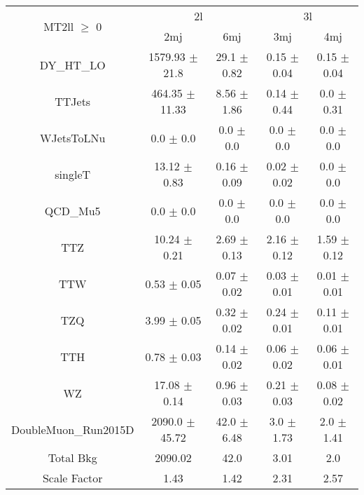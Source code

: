 \documentclass[8pt,landscape]{article}
\begin{document}
\begin{tabular}{|c||c|c||c|c|}
\hline
\multirow{2}{*}{MT2ll $\geq$ 0}& \multicolumn{2}{|c||}{2l}& \multicolumn{2}{|c|}{3l}\\ \cline{2-3} 
& 2mj& 6mj& 3mj& 4mj\\ \hline \hline 
DY\_HT\_LO & 1579.93 $\pm$ 21.8 & 29.1 $\pm$ 0.82 & 0.15 $\pm$ 0.04 & 0.15 $\pm$ 0.04\\ \hline 
TTJets & 464.35 $\pm$ 11.33 & 8.56 $\pm$ 1.86 & 0.14 $\pm$ 0.44 & 0.0 $\pm$ 0.31\\ \hline 
WJetsToLNu & 0.0 $\pm$ 0.0 & 0.0 $\pm$ 0.0 & 0.0 $\pm$ 0.0 & 0.0 $\pm$ 0.0\\ \hline 
singleT & 13.12 $\pm$ 0.83 & 0.16 $\pm$ 0.09 & 0.02 $\pm$ 0.02 & 0.0 $\pm$ 0.0\\ \hline 
QCD\_Mu5 & 0.0 $\pm$ 0.0 & 0.0 $\pm$ 0.0 & 0.0 $\pm$ 0.0 & 0.0 $\pm$ 0.0\\ \hline 
TTZ & 10.24 $\pm$ 0.21 & 2.69 $\pm$ 0.13 & 2.16 $\pm$ 0.12 & 1.59 $\pm$ 0.12\\ \hline 
TTW & 0.53 $\pm$ 0.05 & 0.07 $\pm$ 0.02 & 0.03 $\pm$ 0.01 & 0.01 $\pm$ 0.01\\ \hline 
TZQ & 3.99 $\pm$ 0.05 & 0.32 $\pm$ 0.02 & 0.24 $\pm$ 0.01 & 0.11 $\pm$ 0.01\\ \hline 
TTH & 0.78 $\pm$ 0.03 & 0.14 $\pm$ 0.02 & 0.06 $\pm$ 0.02 & 0.06 $\pm$ 0.01\\ \hline 
WZ & 17.08 $\pm$ 0.14 & 0.96 $\pm$ 0.03 & 0.21 $\pm$ 0.03 & 0.08 $\pm$ 0.02\\ \hline 
DoubleMuon\_Run2015D & 2090.0 $\pm$ 45.72 & 42.0 $\pm$ 6.48 & 3.0 $\pm$ 1.73 & 2.0 $\pm$ 1.41\\ \hline 
\hline
Total Bkg & 2090.02 & 42.0 & 3.01 & 2.0 \\ \hline
Scale Factor & 1.43 & 1.42 & 2.31 & 2.57 \\ \hline
\end{tabular}
\end{document}
